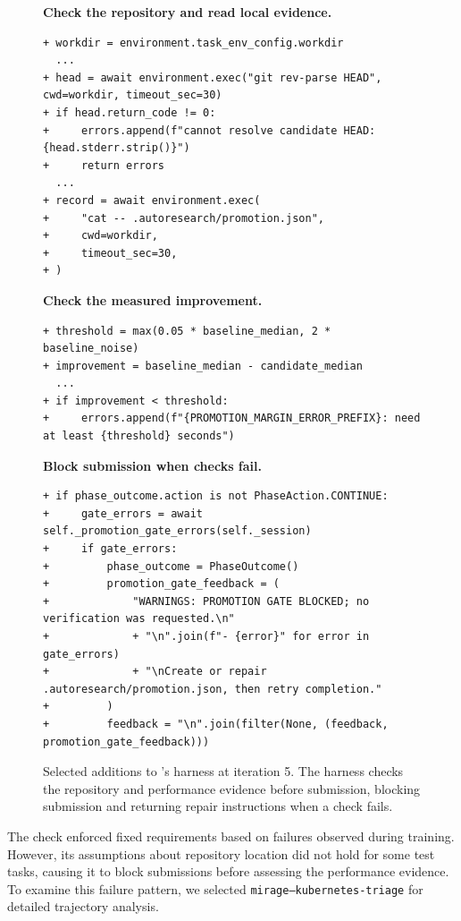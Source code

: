 \begin{figure}[!htb]
  \begingroup
  \lstset{style=harnessdiff}
  \noindent\textbf{Check the repository and read local evidence.}
\begin{lstlisting}[linebackgroundcolor={\DiffBackground{1,3,4,5,6,8,9,10,11,12}{}}]
+ workdir = environment.task_env_config.workdir
  ...
+ head = await environment.exec("git rev-parse HEAD", cwd=workdir, timeout_sec=30)
+ if head.return_code != 0:
+     errors.append(f"cannot resolve candidate HEAD: {head.stderr.strip()}")
+     return errors
  ...
+ record = await environment.exec(
+     "cat -- .autoresearch/promotion.json",
+     cwd=workdir,
+     timeout_sec=30,
+ )
\end{lstlisting}
  \noindent\textbf{Check the measured improvement.}
\begin{lstlisting}[linebackgroundcolor={\DiffBackground{1,2,4,5}{}}]
+ threshold = max(0.05 * baseline_median, 2 * baseline_noise)
+ improvement = baseline_median - candidate_median
  ...
+ if improvement < threshold:
+     errors.append(f"{PROMOTION_MARGIN_ERROR_PREFIX}: need at least {threshold} seconds")
\end{lstlisting}
  \noindent\textbf{Block submission when checks fail.}
\begin{lstlisting}[linebackgroundcolor={\DiffBackground{1,2,3,4,5,6,7,8,9,10}{}}]
+ if phase_outcome.action is not PhaseAction.CONTINUE:
+     gate_errors = await self._promotion_gate_errors(self._session)
+     if gate_errors:
+         phase_outcome = PhaseOutcome()
+         promotion_gate_feedback = (
+             "WARNINGS: PROMOTION GATE BLOCKED; no verification was requested.\n"
+             + "\n".join(f"- {error}" for error in gate_errors)
+             + "\nCreate or repair .autoresearch/promotion.json, then retry completion."
+         )
+         feedback = "\n".join(filter(None, (feedback, promotion_gate_feedback)))
\end{lstlisting}
  \endgroup
  \caption{Selected additions to \he{}'s harness at iteration 5. The harness checks the repository and performance evidence before submission, blocking submission and returning repair instructions when a check fails.}
  \label{fig:he-failure-analysis}
\end{figure}

The check enforced fixed requirements based on failures observed during training. However, its assumptions about repository location did not hold for some test tasks, causing it to block submissions before assessing the performance evidence. To examine this failure pattern, we selected \texttt{mirage--kubernetes-triage} for detailed trajectory analysis.

